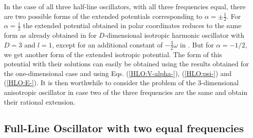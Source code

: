 \documentclass[12pt]{article}
\numberwithin{equation}{section} %
\begin{document}
In the case of all three 
half-line oscillators, with all three frequencies equal, there are two possible
forms of the extended potentials corresponding to \(\alpha=\pm\frac{1}{2}\). 
For $\alpha=\frac{1}{2}$ the extended potential obtained in polar coordinates 
reduces to the same form as already obtained in \cite{yadava2017rationally} for
$D$-dimensional isotropic harmonic oscillator with $D=3$ and $l=1$, except for 
an additional constant of $-\frac{3}{2}\omega$ in \cite{yadava2017rationally}. 
But for $\alpha=-1/2$, we get another form of the extended isotropic potential.
The form of this potential with their solutions can easily be obtained using 
the results obtained for the one-dimensional case and using Eqs. 
(\ref{HLO:V-alpha-}), (\ref{HLO:psi-}) and (\ref{HLO:E-}). It is then 
worthwhile to consider the problem of the 3-dimensional anisotropic oscillator
in case two of the three frequencies are the same and obtain their rational 
extension.

\subsection{Full-Line Oscillator with two equal frequencies}
\end{document}
